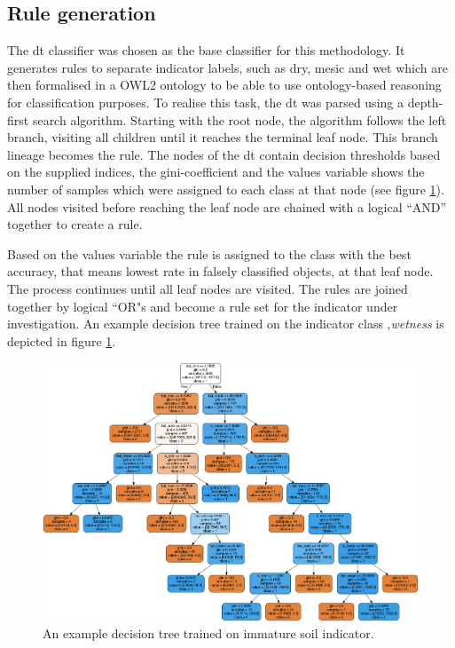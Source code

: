 \documentclass[authoryear,review,12pt,number]{elsarticle}
\begin{document}
\subsection{Rule generation}
\label{subsec:rule_generation}

The \gls{dt} classifier was chosen as the base classifier for this methodology.
It generates rules to separate indicator labels, such as dry, mesic
and wet which are then formalised in a OWL2 ontology to be able to use
ontology-based reasoning for classification purposes. To realise this task, the
\gls{dt} was parsed using a depth-first search algorithm. %
Starting with the root node, the algorithm follows the left 
branch, visiting all children until it reaches the terminal leaf node. This 
branch lineage becomes the rule. The nodes of the \gls{dt} contain decision 
thresholds based on the supplied indices, the gini-coefficient and the values 
variable shows  
the number of samples which were assigned to each class at that node (see 
figure 
\ref{fig:decisiontree}). All nodes visited before reaching the leaf node are 
chained with a logical ``AND'' together to create a rule. 

Based on the values variable the rule is
assigned to the class with the best accuracy, that means lowest rate in falsely
classified objects, %
 at that leaf node.
The process continues until all leaf nodes are visited. The rules are joined together by
logical ``OR"s and become a rule set for the indicator under investigation. An
example decision tree trained on the indicator class ‚\textit{wetness} is
depicted in figure \ref{fig:decisiontree}.%
\begin{figure}
\includegraphics[width=\textwidth]{diagrams/natfo_immature_soil_dt.png}
    \caption{An example decision tree trained on immature soil 
indicator.\label{fig:decisiontree}}
\end{figure}
\end{document}
